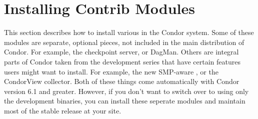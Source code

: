 \section{\label{sec:Contrib-Install}Installing Contrib Modules}

This section describes how to install various 
in the Condor system.
Some of these modules are separate, optional pieces, not included in
the main distribution of Condor.
For example, the checkpoint server, or DagMan.
Others are integral parts of Condor taken from the development series
that have certain features users might want to install.
For example, the new SMP-aware , or the CondorView
collector.  
Both of these things come automatically with Condor version 6.1 and
greater.
However, if you don't want to switch over to using only the
development binaries, you can install these seperate modules and
maintain most of the stable release at your site.









